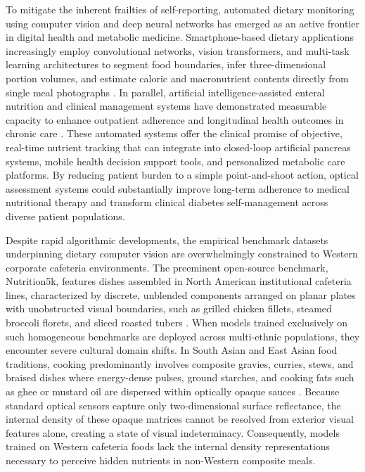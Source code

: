 \documentclass[utf8]{FrontiersinVancouver}
\begin{document}
To mitigate the inherent frailties of self-reporting, automated dietary monitoring using computer vision and deep neural networks has emerged as an active frontier in digital health and metabolic medicine. Smartphone-based dietary applications increasingly employ convolutional networks, vision transformers, and multi-task learning architectures to segment food boundaries, infer three-dimensional portion volumes, and estimate caloric and macronutrient contents directly from single meal photographs \citep{Thames2021Nutrition5k,Elor2026SegmentationGranularity,Tsuboi2026DietitianPrompt,Wu2025FFBFormer}. In parallel, artificial intelligence-assisted enteral nutrition and clinical management systems have demonstrated measurable capacity to enhance outpatient adherence and longitudinal health outcomes in chronic care \citep{Liu2025AINutrition}. These automated systems offer the clinical promise of objective, real-time nutrient tracking that can integrate into closed-loop artificial pancreas systems, mobile health decision support tools, and personalized metabolic care platforms. By reducing patient burden to a simple point-and-shoot action, optical assessment systems could substantially improve long-term adherence to medical nutritional therapy and transform clinical diabetes self-management across diverse patient populations.

Despite rapid algorithmic developments, the empirical benchmark datasets underpinning dietary computer vision are overwhelmingly constrained to Western corporate cafeteria environments. The preeminent open-source benchmark, Nutrition5k, features dishes assembled in North American institutional cafeteria lines, characterized by discrete, unblended components arranged on planar plates with unobstructed visual boundaries, such as grilled chicken fillets, steamed broccoli florets, and sliced roasted tubers \citep{Thames2021Nutrition5k}. When models trained exclusively on such homogeneous benchmarks are deployed across multi-ethnic populations, they encounter severe cultural domain shifts. In South Asian and East Asian food traditions, cooking predominantly involves composite gravies, curries, stews, and braised dishes where energy-dense pulses, ground starches, and cooking fats such as ghee or mustard oil are dispersed within optically opaque sauces \citep{Ahmed2025FoodBD}. Because standard optical sensors capture only two-dimensional surface reflectance, the internal density of these opaque matrices cannot be resolved from exterior visual features alone, creating a state of visual indeterminacy. Consequently, models trained on Western cafeteria foods lack the internal density representations necessary to perceive hidden nutrients in non-Western composite meals.
\end{document}
